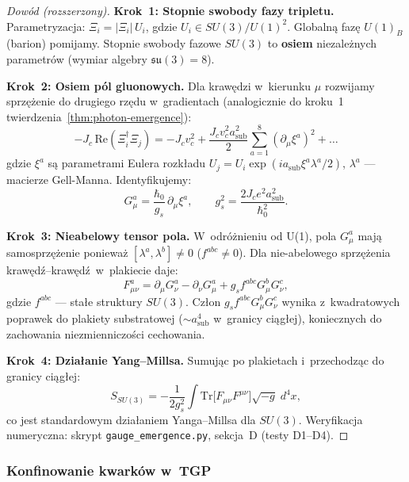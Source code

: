 \begin{proof}[Dowód (rozszerzony)]
\textbf{Krok~1: Stopnie swobody fazy tripletu.}
Parametryzacja: $\Xi_i = |\Xi_i|\,U_i$, gdzie $U_i \in SU(3)/U(1)^2$.
Globalną fazę $U(1)_B$ (barion) pomijamy. Stopnie swobody
fazowe $SU(3)$ to \textbf{osiem} niezależnych parametrów
(wymiar algebry $\mathfrak{su}(3) = 8$).

\textbf{Krok~2: Osiem pól gluonowych.}
Dla krawędzi w~kierunku $\mu$ rozwijamy sprzężenie do drugiego rzędu
w~gradientach (analogicznie do kroku~1 twierdzenia~\ref{thm:photon-emergence}):
\[
  -J_c\,\mathrm{Re}(\Xi_i^\dagger\Xi_j)
  = -J_c v_c^2 + \frac{J_c v_c^2 a_{\mathrm{sub}}^2}{2}
    \sum_{a=1}^{8}(\partial_\mu\xi^a)^2 + \ldots
\]
gdzie $\xi^a$ są parametrami Eulera rozkładu $U_j = U_i\exp(ia_{\mathrm{sub}}\xi^a\lambda^a/2)$,
$\lambda^a$ --- macierze Gell-Manna. Identyfikujemy:
\begin{equation}\label{eq:gluon-id}
    G_\mu^a = \frac{\hbar_0}{g_s}\,\partial_\mu\xi^a,
    \qquad
    g_s^2 = \frac{2J_c e^2 a_{\mathrm{sub}}^2}{\hbar_0^2}.
\end{equation}

\textbf{Krok~3: Nieabelowy tensor pola.}
W~odróżnieniu od U(1), pola $G_\mu^a$ mają samosprzężenie
ponieważ $[\lambda^a, \lambda^b] \neq 0$ ($f^{abc} \neq 0$).
Dla nie-abelowego sprzężenia krawędź--krawędź~w~plakiecie daje:
\begin{equation}\label{eq:SU3-plaq}
    F_{\mu\nu}^a = \partial_\mu G_\nu^a - \partial_\nu G_\mu^a
    + g_s f^{abc} G_\mu^b G_\nu^c,
\end{equation}
gdzie $f^{abc}$ --- stałe struktury $SU(3)$.
Człon $g_s f^{abc}G_\mu^b G_\nu^c$ wynika z~kwadratowych poprawek
do plakiety substratowej ($\sim a_{\mathrm{sub}}^4$ w~granicy
ciągłej), koniecznych do zachowania niezmienniczości cechowania.

\textbf{Krok~4: Działanie Yang--Millsa.}
Sumując po plakietach i~przechodząc do granicy ciągłej:
\begin{equation}\label{eq:YM-from-substrate}
    S_{SU(3)}
    = -\frac{1}{2g_s^2}\int
      \mathrm{Tr}\bigl[F_{\mu\nu}F^{\mu\nu}\bigr]\sqrt{-g}\;d^4x,
\end{equation}
co jest standardowym działaniem Yanga--Millsa dla $SU(3)$.
Weryfikacja numeryczna: skrypt \texttt{gauge\_emergence.py},
sekcja~D (testy D1--D4).
\end{proof}

\subsubsection{Konfinowanie kwarków w~TGP}

